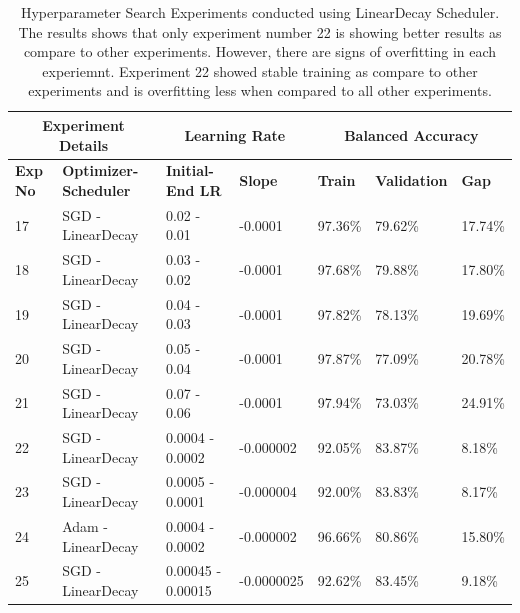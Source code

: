 \documentclass{report} %
\begin{document}
\begin{table}[]
\caption[Hyperparameter Search Experiments conducted using LinearDecay Scheduler.]{Hyperparameter Search Experiments conducted using LinearDecay Scheduler. The results shows that only experiment number 22 is showing better results as compare to other experiments. However, there are signs of overfitting in each experiemnt. Experiment 22 showed stable training as compare to other experiments and is overfitting less when compared to all other experiments.}
\label{table:lineadecay-detailed}
\begin{center}
\small
\begin{tabular}{lllllll}
\multicolumn{2}{c}{\bf{Experiment Details}} & \multicolumn{2}{c}{\bf{Learning Rate}} & \multicolumn{3}{c}{\bf{Balanced Accuracy}} \\
\hline
\bf{Exp No} & \bf{Optimizer-Scheduler} & \bf{Initial-End LR} & \bf{Slope} & \bf{Train} & \bf{Validation} & \bf{Gap} \\
\hline
17 & SGD - LinearDecay & 0.02 - 0.01 & -0.0001 & 97.36\% & 79.62\% & 17.74\% \\
18 & SGD - LinearDecay & 0.03 - 0.02 & -0.0001 & 97.68\% & 79.88\% & 17.80\% \\
19 & SGD - LinearDecay & 0.04 - 0.03 & -0.0001 & 97.82\% & 78.13\% & 19.69\% \\
20 & SGD - LinearDecay & 0.05 - 0.04 & -0.0001 & 97.87\% & 77.09\% & 20.78\% \\
21 & SGD - LinearDecay & 0.07 - 0.06 & -0.0001 & 97.94\% & 73.03\% & 24.91\% \\
22 & SGD - LinearDecay & 0.0004 - 0.0002 & -0.000002 & 92.05\% & 83.87\% & 8.18\% \\
23 & SGD - LinearDecay & 0.0005 - 0.0001 & -0.000004 & 92.00\% & 83.83\% & 8.17\% \\
24 & Adam - LinearDecay & 0.0004 - 0.0002 & -0.000002 & 96.66\% & 80.86\% & 15.80\% \\
25 & SGD - LinearDecay & 0.00045 - 0.00015 & -0.0000025 & 92.62\% & 83.45\% & 9.18\% \\
\hline
\end{tabular}
\end{center}
\end{table}
\end{document}
